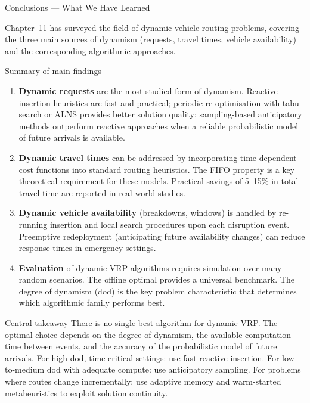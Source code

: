 \documentclass[aspectratio=169,10pt]{beamer}
\begin{document}
\begin{frame}[allowframebreaks]{Conclusions — What We Have Learned}

  Chapter~11 has surveyed the field of dynamic vehicle routing problems,
  covering the three main sources of dynamism (requests, travel times,
  vehicle availability) and the corresponding algorithmic approaches.

  \begin{block}{Summary of main findings}
    \begin{enumerate}
      \item \textbf{Dynamic requests} are the most studied form of dynamism.
            Reactive insertion heuristics are fast and practical; periodic
            re-optimisation with tabu search or ALNS provides better solution
            quality; sampling-based anticipatory methods outperform reactive
            approaches when a reliable probabilistic model of future arrivals
            is available.
      \item \textbf{Dynamic travel times} can be addressed by incorporating
            time-dependent cost functions into standard routing heuristics.
            The FIFO property is a key theoretical requirement for these
            models.  Practical savings of 5--15\% in total travel time are
            reported in real-world studies.
      \item \textbf{Dynamic vehicle availability} (breakdowns, windows)
            is handled by re-running insertion and local search procedures
            upon each disruption event.  Preemptive redeployment (anticipating
            future availability changes) can reduce response times in emergency
            settings.
      \item \textbf{Evaluation} of dynamic VRP algorithms requires
            simulation over many random scenarios.  The offline optimal
            provides a universal benchmark.  The degree of dynamism (dod)
            is the key problem characteristic that determines which algorithmic
            family performs best.
    \end{enumerate}
  \end{block}

  \framebreak

  \begin{alertblock}{Central takeaway}
    There is no single best algorithm for dynamic VRP.  The optimal choice
    depends on the degree of dynamism, the available computation time between
    events, and the accuracy of the probabilistic model of future arrivals.
    For high-dod, time-critical settings: use fast reactive insertion.
    For low-to-medium dod with adequate compute: use anticipatory sampling.
    For problems where routes change incrementally: use adaptive memory and
    warm-started metaheuristics to exploit solution continuity.
  \end{alertblock}

\end{frame}
\end{document}
